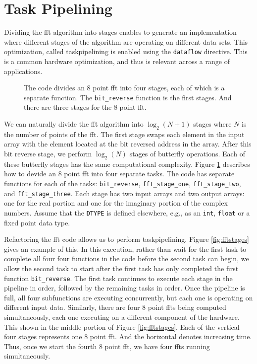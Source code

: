 \section{Task Pipelining}
\label{sec:fft_task_pipelining}

Dividing the \gls{fft} algorithm into stages enables \VHLS to generate an implementation where different stages of the algorithm are operating on different data sets. This optimization, called \gls{taskpipelining} is enabled using the \lstinline{dataflow} directive. This is a common hardware optimization, and thus is relevant across a range of applications.

\begin{figure}

\caption{ The code divides an 8 point \gls{fft} into four stages, each of which is a separate function. The \lstinline{bit_reverse} function is the first stages. And there are three stages for the 8 point \gls{fft}. }
\label{fig:fft_stages_code}
\end{figure}

We can naturally divide the \gls{fft} algorithm into $\log_2(N+1)$ stages where $N$ is the number of points of the \gls{fft}.  The first stage swaps each element in the input array with the element located at the bit reversed address in the array. After this bit reverse stage, we perform $\log_2(N)$ stages of butterfly operations. Each of these butterfly stages has the same computational complexity.  Figure \ref{fig:fft_stages_code} describes how to devide an 8 point \gls{fft} into four separate tasks. The code has separate functions for each of the tasks: \lstinline{bit_reverse}, \lstinline{fft_stage_one}, \lstinline{fft_stage_two}, and \lstinline{fft_stage_three}. Each stage has two input arrays and two output arrays: one for the real portion and one for the imaginary portion of the complex numbers. Assume that the \lstinline{DTYPE} is defined elsewhere, e.g., as an \lstinline{int}, \lstinline{float} or a fixed point data type.

Refactoring the \gls{fft} code allows us to perform \gls{taskpipelining}. Figure \ref{fig:fftstages} gives an example of this. In this execution, rather than wait for the first task to complete all four four functions in the code before the second task can begin, we allow the second task to start after the first task has only completed the first function \lstinline{bit_reverse}. The first task continues to execute each stage in the pipeline in order, followed by the remaining tasks in order.  Once the pipeline is full, all four subfunctions are executing concurrently, but each one is operating on different input data. Similarly, there are four 8 point \gls{fft}s being computed simultaneously, each one executing on a different component of the hardware. This shown in the middle portion of Figure \ref{fig:fftstages}. Each of the vertical four stages represents one 8 point \gls{fft}. And the horizontal denotes increasing time. Thus, once we start the fourth 8 point \gls{fft}, we have four \gls{fft}s running simultaneously. 

